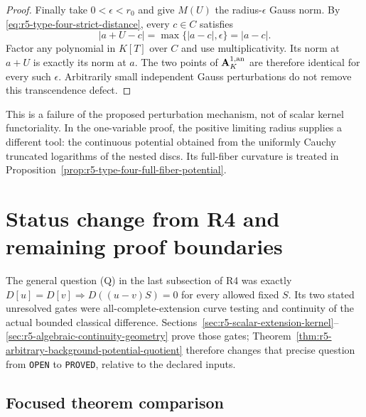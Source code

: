 \documentclass[11pt,a4paper]{article}
\numberwithin{equation}{section}
\theoremstyle{definition}
\theoremstyle{remark}
\begin{document}
\begin{proof}
Finally take $0<\epsilon<r_0$ and give $M(U)$ the
radius-$\epsilon$ Gauss norm.  By
\eqref{eq:r5-type-four-strict-distance}, every $c\in C$ satisfies
\[
 |a+U-c|=\max\{|a-c|,\epsilon\}=|a-c|.
\]
Factor any polynomial in $K[T]$ over $C$ and use multiplicativity.
Its norm at $a+U$ is exactly its norm at $a$.  The two points of
$\mathbf A_K^{1,\rm an}$ are therefore identical for every such
$\epsilon$.  Arbitrarily small independent Gauss perturbations
do not remove this transcendence defect.
\end{proof}

This is a failure of the proposed perturbation mechanism, not of
scalar kernel functoriality.  In the one-variable proof, the
positive limiting radius supplies a different tool: the continuous
potential obtained from the uniformly Cauchy truncated logarithms
of the nested discs.  Its full-fiber curvature is treated in
Proposition~\ref{prop:r5-type-four-full-fiber-potential}.



\section{Status change from R4 and remaining proof boundaries}
\label{sec:r5-status}

The general question (Q) in the last subsection of R4 was exactly
$D[u]=D[v]\Rightarrow D((u-v)S)=0$ for every allowed fixed $S$.
Its two stated unresolved gates were all-complete-extension
curve testing and continuity of the actual bounded classical
difference. Sections~\ref{sec:r5-scalar-extension-kernel}--
\ref{sec:r5-algebraic-continuity-geometry} prove those gates;
Theorem~\ref{thm:r5-arbitrary-background-potential-quotient}
therefore changes that precise question from \texttt{OPEN} to
\texttt{PROVED}, relative to the declared inputs.

\subsection{Focused theorem comparison}
\end{document}
